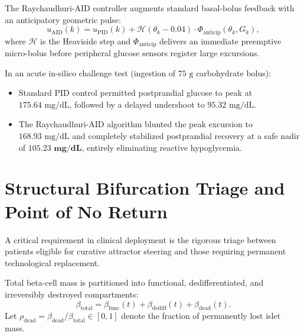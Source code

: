 \documentclass[11pt,a4paper]{article}
\begin{document}
The Raychaudhuri-AID controller augments standard basal-bolus feedback with an anticipatory geometric pulse:
\begin{equation}
u_{\mathrm{AID}}(k) = u_{\mathrm{PID}}(k) + \mathcal{H}(\theta_k - 0.04) \cdot \Phi_{\mathrm{anticip}}(\theta_k, G_k),
\end{equation}
where $\mathcal{H}$ is the Heaviside step and $\Phi_{\mathrm{anticip}}$ delivers an immediate preemptive micro-bolus before peripheral glucose sensors register large excursions.

In an acute in-silico challenge test (ingestion of $75\text{ g}$ carbohydrate bolus):
\begin{itemize}
    \item Standard PID control permitted postprandial glucose to peak at $175.64\text{ mg/dL}$, followed by a delayed undershoot to $95.32\text{ mg/dL}$.
    \item The Raychaudhuri-AID algorithm blunted the peak excursion to $168.93\text{ mg/dL}$ and completely stabilized postprandial recovery at a safe nadir of $\mathbf{105.23\text{ mg/dL}}$, entirely eliminating reactive hypoglycemia.
\end{itemize}

\section{Structural Bifurcation Triage and Point of No Return}

A critical requirement in clinical deployment is the rigorous triage between patients eligible for curative attractor steering and those requiring permanent technological replacement.

Total beta-cell mass is partitioned into functional, dedifferentiated, and irreversibly destroyed compartments:
\begin{equation}
\beta_{\mathrm{total}} = \beta_{\mathrm{func}}(t) + \beta_{\mathrm{dediff}}(t) + \beta_{\mathrm{dead}}(t).
\end{equation}
Let $\rho_{\mathrm{dead}} = \beta_{\mathrm{dead}} / \beta_{\mathrm{total}} \in [0, 1]$ denote the fraction of permanently lost islet mass.
\end{document}
